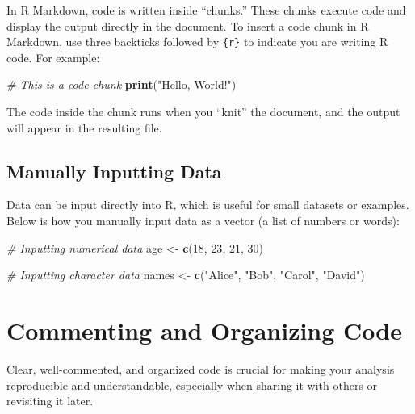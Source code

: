 \documentclass[
]{book}
\newenvironment{Shaded}{\begin{snugshade}}{\end{snugshade}}
\newcommand{\CommentTok}[1]{\textcolor[rgb]{0.56,0.35,0.01}{\textit{#1}}}
\newcommand{\DecValTok}[1]{\textcolor[rgb]{0.00,0.00,0.81}{#1}}
\newcommand{\FunctionTok}[1]{\textcolor[rgb]{0.13,0.29,0.53}{\textbf{#1}}}
\newcommand{\NormalTok}[1]{#1}
\newcommand{\OtherTok}[1]{\textcolor[rgb]{0.56,0.35,0.01}{#1}}
\newcommand{\StringTok}[1]{\textcolor[rgb]{0.31,0.60,0.02}{#1}}
\begin{document}
In R Markdown, code is written inside ``chunks.'' These chunks execute code and display the output directly in the document. To insert a code chunk in R Markdown, use three backticks followed by \texttt{\{r\}} to indicate you are writing R code. For example:

\begin{Shaded}
\begin{Highlighting}[]
\CommentTok{\# This is a code chunk}
\FunctionTok{print}\NormalTok{(}\StringTok{"Hello, World!"}\NormalTok{)}
\end{Highlighting}
\end{Shaded}

The code inside the chunk runs when you ``knit'' the document, and the output will appear in the resulting file.

\subsection*{Manually Inputting Data}\label{manually-inputting-data}

Data can be input directly into R, which is useful for small datasets or examples. Below is how you manually input data as a vector (a list of numbers or words):

\begin{Shaded}
\begin{Highlighting}[]
\CommentTok{\# Inputting numerical data}
\NormalTok{age }\OtherTok{\textless{}{-}} \FunctionTok{c}\NormalTok{(}\DecValTok{18}\NormalTok{, }\DecValTok{23}\NormalTok{, }\DecValTok{21}\NormalTok{, }\DecValTok{30}\NormalTok{)}

\CommentTok{\# Inputting character data}
\NormalTok{names }\OtherTok{\textless{}{-}} \FunctionTok{c}\NormalTok{(}\StringTok{"Alice"}\NormalTok{, }\StringTok{"Bob"}\NormalTok{, }\StringTok{"Carol"}\NormalTok{, }\StringTok{"David"}\NormalTok{)}
\end{Highlighting}
\end{Shaded}

\section{Commenting and Organizing Code}\label{commenting-and-organizing-code}

Clear, well-commented, and organized code is crucial for making your analysis reproducible and understandable, especially when sharing it with others or revisiting it later.
\end{document}
